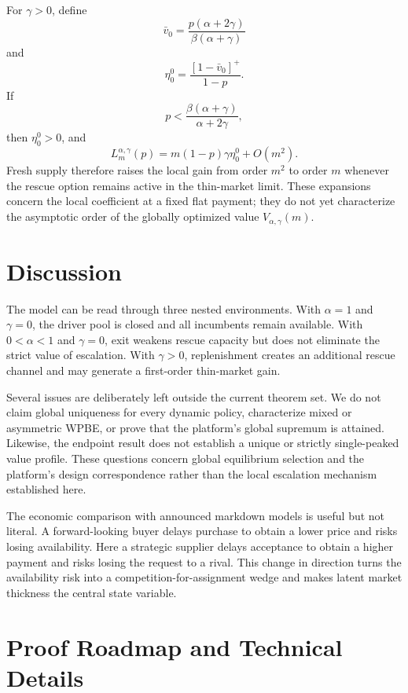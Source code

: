 \documentclass[11pt]{article}
\theoremstyle{definition}
\theoremstyle{remark}
\begin{document}
For \(\gamma>0\), define
\[
  \bar v_0
  =
  \frac{p(\alpha+2\gamma)}
       {\beta(\alpha+\gamma)}
\]
and
\[
  \eta_0^0
  =
  \frac{[1-\bar v_0]^+}{1-p}.
\]
If
\[
  p<
  \frac{\beta(\alpha+\gamma)}
       {\alpha+2\gamma},
\]
then \(\eta_0^0>0\), and
\[
  L_m^{\alpha,\gamma}(p)
  =
  m(1-p)\gamma\eta_0^0+O(m^2).
\]
Fresh supply therefore raises the local gain from order \(m^2\) to order
\(m\) whenever the rescue option remains active in the thin-market limit.
These expansions concern the local coefficient at a fixed flat payment; they
do not yet characterize the asymptotic order of the globally optimized value
\(V_{\alpha,\gamma}(m)\).

\section{Discussion}
\label{sec:discussion}

The model can be read through three nested environments.  With
\(\alpha=1\) and \(\gamma=0\), the driver pool is closed and all incumbents
remain available.  With \(0<\alpha<1\) and \(\gamma=0\), exit weakens rescue
capacity but does not eliminate the strict value of escalation.  With
\(\gamma>0\), replenishment creates an additional rescue channel and may
generate a first-order thin-market gain.

Several issues are deliberately left outside the current theorem set.  We do
not claim global uniqueness for every dynamic policy, characterize mixed or
asymmetric WPBE, or prove that the platform's global supremum is attained.
Likewise, the endpoint result does not establish a unique or strictly
single-peaked value profile.  These questions concern global equilibrium
selection and the platform's design correspondence rather than the local
escalation mechanism established here.

The economic comparison with announced markdown models is useful but not
literal.  A forward-looking buyer delays purchase to obtain a lower price and
risks losing availability.  Here a strategic supplier delays acceptance to
obtain a higher payment and risks losing the request to a rival.  This change
in direction turns the availability risk into a competition-for-assignment
wedge and makes latent market thickness the central state variable.

\appendix

\section{Proof Roadmap and Technical Details}
\label{app:proofs}
\end{document}
